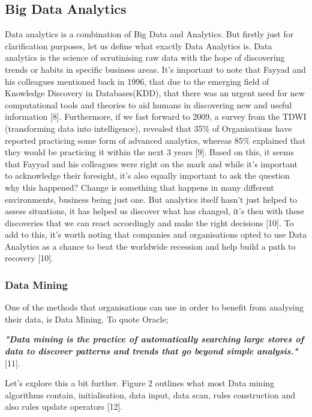 \documentclass[10pt,journal,compsoc]{IEEEtran}
\begin{document}
\subsection{Big Data Analytics}
 Data analytics is a combination of Big Data and Analytics. But firstly just for clarification purposes, let us define what exactly Data Analytics is. Data analytics is the science of scrutinising raw data with the hope of discovering trends or habits in specific business areas. It's important to note that Fayyad and his colleagues mentioned back in 1996, that due to the emerging field of Knowledge Discovery in Databases(KDD), that there was an urgent need for new computational tools and theories to aid humans in discovering new and useful information [8]. Furthermore, if we fast forward to 2009, a survey from the TDWI (transforming data into intelligence), revealed that 35\% of Organisations have reported practicing some form of advanced analytics, whereas 85\% explained that they would be practicing it within the next 3 years [9]. Based on this, it seems that Fayyad and his colleagues were right on the mark and while it's important to acknowledge their foresight, it's also equally important to ask the question why this happened? Change is something that happens in many different environments, business being just one. But analytics itself hasn't just helped to assess situations, it has helped us discover what has changed, it's then with these discoveries that we can react accordingly and make the right decisions [10]. To add to this, it's worth noting that companies and organisations opted to use Data Analytics as a chance to beat the worldwide recession and help build a path to recovery [10].

\subsubsection{Data Mining} 
One of the methods that organisations can use in order to benefit from analysing their data, is Data Mining. To quote Oracle;

\textbf{\textit{"Data mining is the practice of automatically searching large stores of data to discover patterns and trends that go beyond simple analysis."}} [11]. 

Let's explore this a bit further. Figure 2 outlines what most Data mining algorithms contain, initialisation, data input, data scan, rules construction and also rules update operators [12].\\
\end{document}
